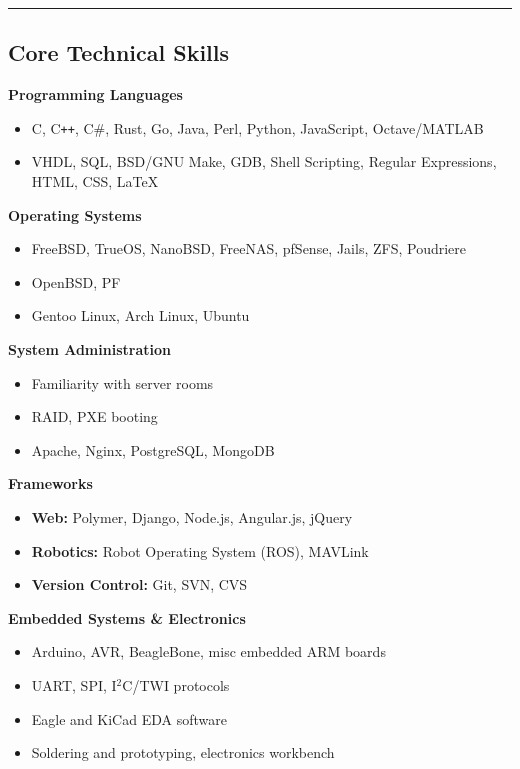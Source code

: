 \documentclass[10pt,letterpaper]{article}
\begin{document}
\vspace{2pt}
\hrule
\vspace{-0.4em}
\subsection*{Core Technical Skills}
    \textbf{Programming Languages}
    \begin{itemize}[label=--]
        \item C, C\texttt{++}, C\#, Rust, Go, Java, Perl, Python, JavaScript,
            Octave/MATLAB
        \item VHDL, SQL, BSD/GNU Make, GDB, Shell Scripting, Regular
            Expressions, HTML, CSS, \LaTeX%
    \end{itemize}
    \textbf{Operating Systems}
    \begin{itemize}[label=--]
        \item FreeBSD, TrueOS, NanoBSD, FreeNAS, pfSense, Jails, ZFS, Poudriere
        \item OpenBSD, PF
        \item Gentoo Linux, Arch Linux, Ubuntu
    \end{itemize}
    \textbf{System Administration}
    \begin{itemize}[label=--]
        \item Familiarity with server rooms
        \item RAID, PXE booting
        \item Apache, Nginx, PostgreSQL, MongoDB
    \end{itemize}
    \textbf{Frameworks}
    \begin{itemize}[label=--]
        \item \textbf{Web:} Polymer, Django, Node.js, Angular.js, jQuery
        \item \textbf{Robotics:} Robot Operating System (ROS), MAVLink
        \item \textbf{Version Control:} Git, SVN, CVS
    \end{itemize}
    \textbf{Embedded Systems \& Electronics}
    \begin{itemize}[label=--]
        \item Arduino, AVR, BeagleBone, misc embedded ARM boards
        \item UART, SPI, I$^2$C/TWI protocols
        \item Eagle and KiCad EDA software
        \item Soldering and prototyping, electronics workbench
    \end{itemize}
\end{document}
